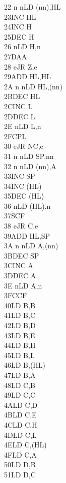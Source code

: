 \documentclass[twoside,openright,a4paper]{book}
\begin{document}
\begin{multicols}{3}
{\begin{tabbing}
	22 n n\>LD (nn),HL\\
	23\>INC HL\\
	24\>INC H\\
	25\>DEC H\\
	26 n\>LD H,n\\
	27\>DAA\\
	28 e\>JR Z,e\\
	29\>ADD HL,HL\\
	2A n n\>LD HL,(nn)\\
	2B\>DEC HL\\
	2C\>INC L\\
	2D\>DEC L\\
	2E n\>LD L,n\\
	2F\>CPL\\
	30 e\>JR NC,e\\
	31 n n\>LD SP,nn\\
	32 n n\>LD (nn),A\\
	33\>INC SP\\
	34\>INC (HL)\\
	35\>DEC (HL)\\
	36 n\>LD (HL),n\\
	37\>SCF\\
	38 e\>JR C,e\\
	39\>ADD HL,SP\\
	3A n n\>LD A,(nn)\\
	3B\>DEC SP\\
	3C\>INC A\\
	3D\>DEC A\\
	3E n\>LD A,n\\
	3F\>CCF\\
	40\>LD B,B\\
	41\>LD B,C\\
	42\>LD B,D\\
	43\>LD B,E\\
	44\>LD B,H\\
	45\>LD B,L\\
	46\>LD B,(HL)\\
	47\>LD B,A\\
	48\>LD C,B\\
	49\>LD C,C\\
	4A\>LD C,D\\
	4B\>LD C,E\\
	4C\>LD C,H\\
	4D\>LD C,L\\
	4E\>LD C,(HL)\\
	4F\>LD C,A\\
	50\>LD D,B\\
	51\>LD D,C\\

\end{tabbing}}
\end{multicols}
\end{document}
